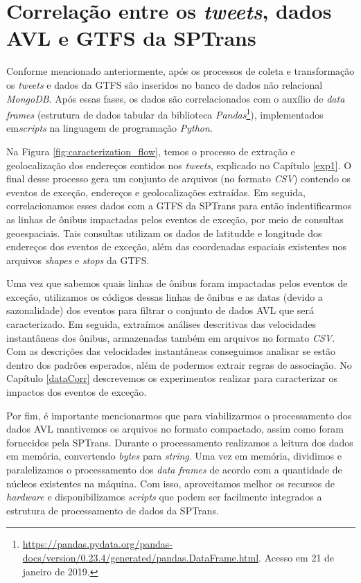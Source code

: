 \documentclass[
	12pt,				%
	oneside,			%
	a4paper,			%
	english,			%
	brazil				%
	]{abntex2ppgsi}
\begin{document}
{{{\section{Correlação entre os \textit{tweets}, dados AVL e GTFS da SPTrans}
\label{corrAll}

Conforme mencionado anteriormente, após os processos de coleta e transformação os \textit{tweets} e dados da GTFS são inseridos no banco de dados não relacional \textit{MongoDB}. Após essas fases, os dados são correlacionados com o auxílio de \textit{data frames} (estrutura de dados tabular da biblioteca \textit{Pandas}\footnote{\url{https://pandas.pydata.org/pandas-docs/version/0.23.4/generated/pandas.DataFrame.html}. Acesso em 21 de janeiro de 2019.}), implementados em\textit{scripts} na linguagem de programação \textit{Python}.

Na Figura \ref{fig:caracterization_flow}, temos o processo de extração e geolocalização dos endereços contidos nos \textit{tweets}, explicado no Capítulo \ref{exp1}. O final desse processo gera um conjunto de arquivos (no formato \textit{CSV}) contendo os eventos de exceção, endereços e geolocalizações extraídas.  Em seguida, correlacionamos esses dados com a GTFS da SPTrans para então indentificarmos as linhas de ônibus impactadas pelos eventos de exceção, por meio de consultas geoespaciais. Tais consultas utilizam os dados de latitudde e longitude dos endereços dos eventos de exceção, além das coordenadas espaciais existentes nos arquivos \textit{shapes} e \textit{stops} da GTFS.

Uma vez que sabemos quais linhas de ônibus foram impactadas pelos eventos de exceção, utilizamos os códigos dessas linhas de ônibus e as datas (devido a sazonalidade) dos eventos para filtrar o conjunto de dados AVL que será caracterizado. Em seguida, extraímos análises descritivas das velocidades instantâneas dos ônibus, armazenadas também em arquivos no formato \textit{CSV}. Com as descrições das velocidades instantâneas conseguimos analisar se estão dentro dos padrões esperados, além de podermos extrair regras de associação. No Capítulo \ref{dataCorr} descrevemos os experimentos realizar para caracterizar os impactos dos eventos de exceção.

Por fim, é importante mencionarmos que para viabilizarmos o processamento dos dados AVL mantivemos os arquivos no formato compactado, assim como foram fornecidos pela SPTrans. Durante o processamento realizamos a leitura dos dados em memória, convertendo \textit{bytes} para \textit{string}. Uma vez em memória, dividimos e paralelizamos o processamento dos \textit{data frames} de acordo com a quantidade de núcleos existentes na máquina. Com isso, aproveitamos melhor os recursos de \textit{hardware} e disponibilizamos \textit{scripts} que podem ser facilmente integrados a estrutura de processamento de dados da SPTrans.

}}}
\end{document}
